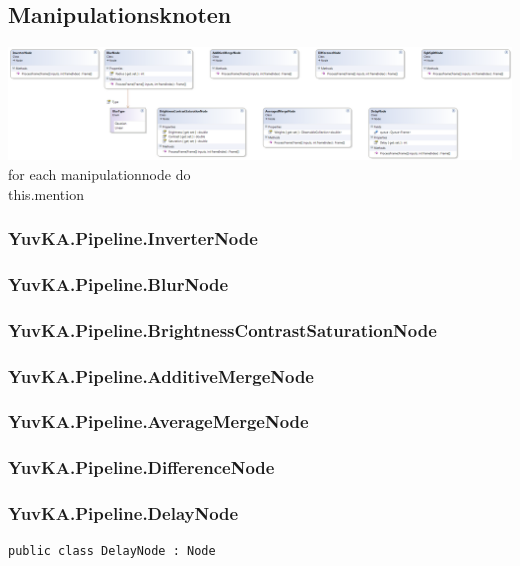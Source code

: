 \subsection{Manipulationsknoten}

\includegraphics[width=\textwidth]{YuvKA.Pipeline/manipulationnodes.png}
for each manipulationnode do\\
this.mention

\subsubsection{YuvKA.Pipeline.InverterNode}

\subsubsection{YuvKA.Pipeline.BlurNode}

\subsubsection{YuvKA.Pipeline.BrightnessContrastSaturationNode}

\subsubsection{YuvKA.Pipeline.AdditiveMergeNode}

\subsubsection{YuvKA.Pipeline.AverageMergeNode}

\subsubsection{YuvKA.Pipeline.DifferenceNode}

\subsubsection{YuvKA.Pipeline.DelayNode}

\begin{verbatim}
public class DelayNode : Node
\end{verbatim}

